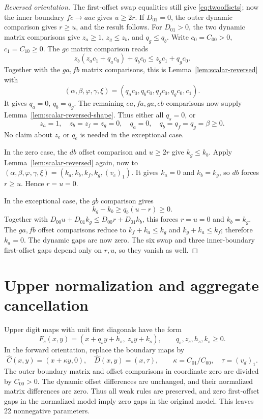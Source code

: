 \documentclass[11pt,a4paper]{article}
\begin{document}
\begin{proof}[Reversed orientation]
The first-offset swap equalities still give \eqref{eq:twooffsets}; now
the inner boundary $fc\to aac$ gives $u\ge2r$. If $D_{01}=0$, the
outer dynamic comparison gives $r\ge u$, and the result follows.
For $D_{01}>0$, the two dynamic matrix comparisons give
\(z_a\ge1\), \(z_g\le z_b\), and \(q_g\le q_b\).
Write \(c_0=C_{00}>0\), \(c_1=C_{10}\ge0\).
The \(gc\) matrix comparison reads
\[
z_b(z_ac_1+q_ac_0)+q_bc_0\le z_gc_1+q_gc_0.
\]
Together with the \(ga,fb\) matrix comparisons, this is
Lemma~\ref{lem:scalar-reversed} with
\[
(\alpha,\beta,\varphi,\gamma,\xi)
=(q_ac_0,q_bc_0,q_fc_0,q_gc_0,c_1).
\]
It gives \(q_a=0\), \(q_b=q_g\).
The remaining \(ea,fa,ga,eb\) comparisons now supply
Lemma~\ref{lem:scalar-reversed-shape}. Thus either all \(q_s=0\), or
\[
z_a=1,\quad z_b=z_f=z_g=0,\quad
q_a=0,\quad q_b=q_f=q_g=\beta\ge0.
\]
No claim about \(z_e\) or \(q_e\) is needed in the exceptional case.

In the zero case, the \(db\) offset comparison and \(u\ge2r\) give
\(k_g\le k_b\). Apply Lemma~\ref{lem:scalar-reversed} again,
now to \((\alpha,\beta,\varphi,\gamma,\xi)
=(k_a,k_b,k_f,k_g,(v_c)_1)\).
It gives \(k_a=0\) and \(k_b=k_g\), so \(db\) forces \(r\ge u\).
Hence \(r=u=0\).

In the exceptional case, the \(gb\) comparison gives
\[
k_g-k_b\ge q_b(u-r)\ge0.
\]
Together with
\(D_{00}u+D_{01}k_g\le D_{00}r+D_{01}k_b\),
this forces \(r=u=0\) and \(k_b=k_g\).
The \(ga,fb\) offset comparisons reduce to
\(k_f+k_a\le k_g\) and \(k_g+k_a\le k_f\);
therefore \(k_a=0\).
The dynamic gaps are now zero. The six swap and three inner-boundary
first-offset gaps depend only on \(r,u\), so they vanish as well.
\end{proof}


\section{Upper normalization and aggregate cancellation}
\label{sec:upper-normalization}
Upper digit maps with unit first diagonals have the form
\begin{equation}\label{eq:upper}
F_s(x,y)=(x+q_sy+h_s,\ z_sy+k_s),\qquad q_s,z_s,h_s,k_s\ge0.
\end{equation}
In the forward orientation, replace the boundary maps by
\begin{equation}\label{eq:normal}
\widehat C(x,y)=(x+\kappa y,0),\quad
\widehat D(x,y)=(x,\tau),\qquad
\kappa=C_{01}/C_{00},\quad \tau=(v_d)_1.
\end{equation}
The outer boundary matrix and offset comparisons in coordinate zero
are divided by $C_{00}>0$. The dynamic offset differences are unchanged,
and their normalized matrix differences are zero. Thus all weak rules
are preserved, and zero first-offset gaps in the normalized model imply
zero gaps in the original model. This leaves 22 nonnegative parameters.
\end{document}
